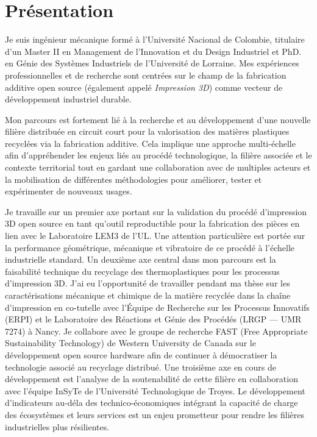 \documentclass[
  12pt,
  oneside]{book}
\begin{document}
\hypertarget{pruxe9sentation}{%
\section{Présentation}\label{pruxe9sentation}}

Je suis ingénieur mécanique formé à l'Université Nacional de Colombie, titulaire d'un Master II en Management de l'Innovation et du Design Industriel et PhD. en Génie des Systèmes Industriels de l'Université de Lorraine. Mes expériences professionnelles et de recherche sont centrées sur le champ de la fabrication additive open source (également appelé \emph{Impression 3D}) comme vecteur de développement industriel durable.

Mon parcours est fortement lié à la recherche et au développement d'une nouvelle filière distribuée en circuit court pour la valorisation des matières plastiques recyclées via la fabrication additive. Cela implique une approche multi-échelle afin d'appréhender les enjeux liés au procédé technologique, la filière associée et le contexte territorial tout en gardant une collaboration avec de multiples acteurs et la mobilisation de différentes méthodologies pour améliorer, tester et expérimenter de nouveaux usages.

Je travaille sur un premier axe portant sur la validation du procédé d'impression 3D open source en tant qu'outil reproductible pour la fabrication des pièces en lien avec le Laboratoire LEM3 de l'UL. Une attention particulière est portée sur la performance géométrique, mécanique et vibratoire de ce procédé à l'échelle industrielle standard.
Un deuxième axe central dans mon parcours est la faisabilité technique du recyclage des thermoplastiques pour les processus d'impression 3D. J'ai eu l'opportunité de travailler pendant ma thèse sur les caractérisations mécanique et chimique de la matière recyclée dans la chaîne d'impression en co-tutelle avec l'Équipe de Recherche sur les Processus Innovatifs (ERPI) et le Laboratoire des Réactions et Génie des Procédés (LRGP --- UMR 7274) à Nancy.
Je collabore avec le groupe de recherche FAST (Free Appropriate Sustainability Technology) de Western University de Canada sur le développement open source hardware afin de continuer à démocratiser la technologie associé au recyclage distribué.
Une troisième axe en cours de développement est l'analyse de la soutenabilité de cette filière en collaboration avec l'équipe InSyTe de l'Université Technologique de Troyes.
Le développement d'indicateurs au-déla des technico-économiques intégrant la capacité de charge des écosystèmes et leurs services est un enjeu prometteur pour rendre les filières industrielles plus résilientes.
\end{document}
